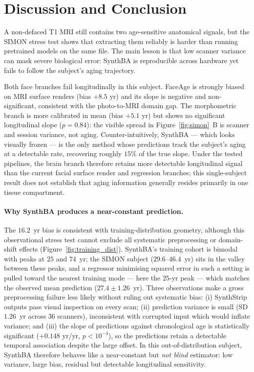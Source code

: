 \documentclass{midl} %
\begin{document}
\section{Discussion and Conclusion}

A non-defaced T1 MRI still contains two age-sensitive anatomical signals,
but the SIMON stress test shows that extracting them reliably is harder than
running pretrained models on the same file.  The main lesson is that low
scanner variance can mask severe biological error: SynthBA is reproducible
across hardware yet fails to follow the subject's aging trajectory.

Both face branches fail longitudinally in this subject.  FaceAge is
strongly biased on MRI surface renders (bias $+8.5$ yr) and its slope is
negative and non-significant, consistent with the photo-to-MRI domain
gap.  The morphometric branch is more calibrated in mean (bias $+5.1$
yr) but shows no significant longitudinal slope ($p{=}0.84$): the
visible spread in Figure~\ref{fig:simon}~B is scanner and session
variance, not aging.  Counter-intuitively, SynthBA --- which looks
visually frozen --- is the only method whose predictions track the
subject's aging at a detectable rate, recovering roughly $15\%$ of the
true slope. Under the tested pipelines, the brain branch therefore retains
more detectable longitudinal signal than the current facial surface render
and regression branches; this single-subject result does not establish that
aging information generally resides primarily in one tissue compartment.

\paragraph{Why SynthBA produces a near-constant prediction.}
The $16.2$~yr bias is consistent with training-distribution geometry, although
this observational stress test cannot exclude all systematic preprocessing
or domain-shift effects (Figure~\ref{fig:training_dist}).  SynthBA's
training cohort is bimodal with peaks at $25$ and $74$~yr; the SIMON
subject ($29.6$--$46.4$~yr) sits in the valley between these peaks, and a
regressor minimising squared error in such a setting is pulled toward the
nearest training mode --- here the $25$-yr peak --- which matches the
observed mean prediction ($27.4 \pm 1.26$~yr). Three observations make a gross
preprocessing failure less likely without ruling out systematic bias:
(i) SynthStrip outputs pass visual inspection on every scan;
(ii) prediction variance is small (SD $1.26$~yr across $36$ scanners),
inconsistent with corrupted input which would inflate variance; and
(iii) the slope of predictions against chronological age is statistically
significant ($+0.148$ yr/yr, $p<10^{-4}$), so the predictions retain a
detectable temporal association despite the large offset.
In this out-of-distribution subject, SynthBA therefore behaves
like a near-constant but \emph{not blind} estimator: low variance, large
bias, residual but detectable longitudinal sensitivity.
\end{document}

